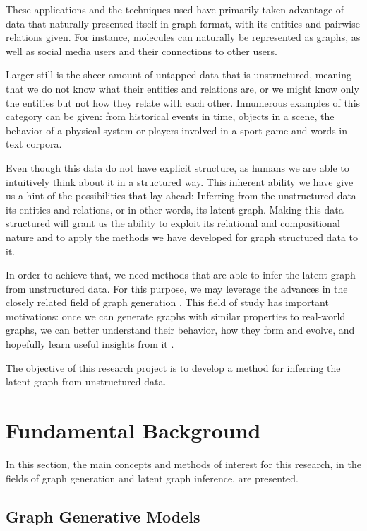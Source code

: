 \documentclass[12pt,a4paper]{article}
\begin{document}
	These applications and the techniques used have primarily taken advantage of data that naturally presented itself in graph format, with its entities and pairwise relations given. For instance, molecules can naturally be represented as graphs, as well as social media users and their connections to other users.
	
	Larger still is the sheer amount of untapped data that is unstructured, meaning that we do not know what their entities and relations are, or we might know only the entities but not how they relate with each other. Innumerous examples of this category can be given: from historical events in time, objects in a scene, the behavior of a physical system or players involved in a sport game and words in text corpora.
	
	Even though this data do not have explicit structure, as humans we are able to intuitively think about it in a structured way. This inherent ability we have give us a hint of the possibilities that lay ahead: Inferring from the unstructured data its entities and relations, or in other words, its latent graph. Making this data structured will grant us the ability to exploit its relational and compositional nature and to apply the methods we have developed for graph structured data to it.
	
	In order to achieve that, we need methods that are able to infer the latent graph from unstructured data. For this purpose, we may leverage the advances in the closely related field of graph generation \citep{ErdösandRényi1960, AlbertandBarabási2002, KipfandWelling2016, Li2018}. This field of study has important motivations: once we can generate graphs with similar properties to real-world graphs, we can better understand their behavior, how they form and evolve, and hopefully learn useful insights from it \citep{Hamilton2020}.
	
	The objective of this research project is to develop a method for inferring the latent graph from unstructured data.
	
	\section{Fundamental Background}
	\label{sec:background}
	
	In this section, the main concepts and methods of interest for this research, in the fields of graph generation and latent graph inference, are presented.
	
	\subsection{Graph Generative Models}
	\label{sec:graph_generative_models}
	
\end{document}
